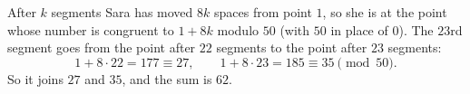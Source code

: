 After $k$ segments Sara has moved $8k$ spaces from point $1$, so she is at the point whose number is congruent to $1+8k$ modulo $50$ (with $50$ in place of $0$). The $23$rd segment goes from the point after $22$ segments to the point after $23$ segments:
\[
1+8\cdot22=177\equiv27,\qquad 1+8\cdot23=185\equiv35\pmod{50}.
\]
So it joins $27$ and $35$, and the sum is $\boxed{62}$.
